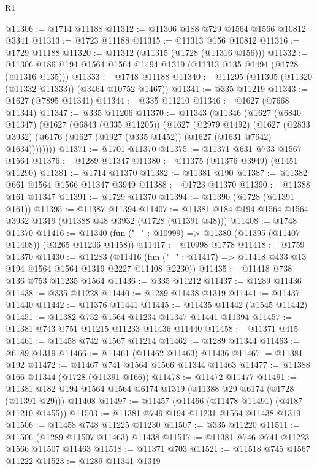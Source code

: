 \begin{lexlean}{R1}
\begin{coremodule}
@11306 := @1714 @11188
@11312 := @11306 @188 @729 @1564 @1566 @10812 @3341
@11313 := @1723 @11188
@11315 := @11313 @156 @10812
@11316 := @1729 @11188
@11320 := @11312 (@11315 (@1728 (@11316 @156)))
@11332 := @11306 @186 @194 @1564 @1564 @1494 @1319 (@11313 @135 @1494 (@1728 (@11316 @135)))
@11333 := @1748 @11188
@11340 := @11295 (@11305 (@11320 (@11332 @11333)) (@3464 @10752 @1467))
@11341 := @335 @11219
@11343 := @1627 (@7895 @11341)
@11344 := @335 @11210
@11346 := @1627 (@7668 @11344)
@11347 := @335 @11206
@11370 := @11343
    (@11346
      (@1627
        (@6840 @11347)
        (@1627
          (@6843 (@335 @11205))
          (@1627
            (@2979 @1492)
            (@1627
              (@2833 @3932)
              (@6176 (@1627 (@1927 (@335 @1452)) (@1627 (@1631 @7642) @1634))))))))
@11371 := @1701 @11370
@11375 := @11371 @631 @733 @1567 @1564
@11376 := @1289 @11347
@11380 := @11375 (@11376 @3949) (@1451 @11290)
@11381 := @1714 @11370
@11382 := @11381 @190
@11387 := @11382 @661 @1564 @1566 @11347 @3949
@11388 := @1723 @11370
@11390 := @11388 @161 @11347
@11391 := @1729 @11370
@11394 := @11390 (@1728 (@11391 @161))
@11395 := @11387 @11394
@11407 := @11381 @184 @194 @1564 @1564 @3932 @1319 (@11388 @48 @3932 (@1728 (@11391 @48)))
@11408 := @1748 @11370
@11416 := @11340 (fun ("_" : @10999) => @11380 (@11395 (@11407 @11408)) (@3265 @11206 @1458))
@11417 := @10998 @1778
@11418 := @1759 @11370
@11430 := @11283
    (@11416 (fun ("_" : @11417) => @11418 @433 @13 @194 @1564 @1564 @1319 @2227 @11408 @2230))
@11435 := @11418 @738 @136 @753 @11235 @1564
@11436 := @335 @11212
@11437 := @1289 @11436
@11438 := @335 @11228
@11440 := @1289 @11438 @1319
@11441 := @11437 @11440
@11442 := @11376 @11441
@11445 := @11435 @11442 (@1545 @11442)
@11451 := @11382 @752 @1564 @11234 @11347 @11441 @11394
@11457 := @11381 @743 @751 @11215 @11233 @11436 @11440
@11458 := @11371 @415
@11461 := @11458 @742 @1567 @11214
@11462 := @1289 @11344
@11463 := @6189 @1319
@11466 := @11461 (@11462 @11463) @11436
@11467 := @11381 @192
@11472 := @11467 @741 @1564 @1566 @11344 @11463
@11477 := @11388 @166 @11344 (@1728 (@11391 @166))
@11478 := @11472 @11477
@11491 := @11381 @182 @194 @1564 @1564 @6174 @1319 (@11388 @29 @6174 (@1728 (@11391 @29))) @11408
@11497 := @11457 (@11466 (@11478 @11491) (@4187 @11210 @1455))
@11503 := @11381 @749 @194 @11231 @1564 @11438 @1319
@11506 := @11458 @748 @11225 @11230
@11507 := @335 @11220
@11511 := @11506 (@1289 @11507 @11463) @11438
@11517 := @11381 @746 @741 @11223 @1566 @11507 @11463
@11518 := @11371 @703
@11521 := @11518 @745 @1567 @11222
@11523 := @1289 @11341 @1319

\end{coremodule}
\end{lexlean}
